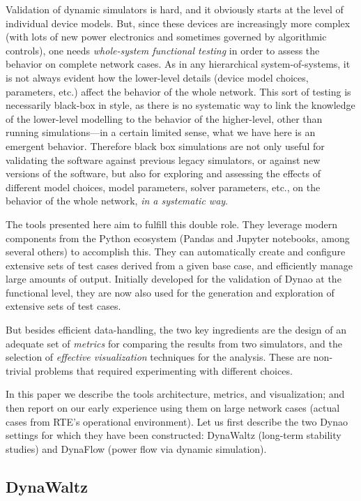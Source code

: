 \documentclass[conference]{IEEEtran}
\newcommand{\Dynawo}{Dyna\textomega o\xspace} %
\begin{document}
Validation of dynamic simulators is hard, and it obviously starts at the level
of individual device models. But, since these devices are increasingly more
complex (with lots of new power electronics and sometimes governed by
algorithmic controls), one needs \emph{whole-system functional testing} in order
to assess the behavior on complete network cases. As in any hierarchical
system-of-systems, it is not always evident how the lower-level details (device
model choices, parameters, etc.)  affect the behavior of the whole network. This
sort of testing is necessarily black-box in style, as there is no systematic
way to link the knowledge of the lower-level modelling to the behavior of the
higher-level, other than running simulations---in a certain limited sense, what
we have here is an emergent behavior.  Therefore black box
simulations are not only useful for validating the software against previous
legacy simulators, or against new versions of the software, but also for
exploring and assessing the effects of different model choices, model
parameters, solver parameters, etc., on the behavior of the whole network,
\emph{in a systematic way}.

The tools presented here aim to fulfill this double role. They leverage modern
components from the Python ecosystem (Pandas and Jupyter notebooks, among
several others) to accomplish this. They can automatically create and configure
extensive sets of test cases derived from a given base case, and efficiently
manage large amounts of output. Initially developed for the validation of
\Dynawo at the functional level, they are now also used for the generation and
exploration of extensive sets of test cases.

But besides efficient data-handling, the two key ingredients are the design of
an adequate set of \emph{metrics} for comparing the results from two simulators,
and the selection of \emph{effective visualization} techniques for the analysis.
These are non-trivial problems that required experimenting with different
choices.

In this paper we describe the tools architecture, metrics, and visualization;
and then report on our early experience using them on large network cases
(actual cases from RTE's operational environment). Let us first describe the two
\Dynawo settings for which they have been constructed: DynaWaltz (long-term
stability studies) and DynaFlow (power flow via dynamic simulation).



\subsection{DynaWaltz}
\end{document}
